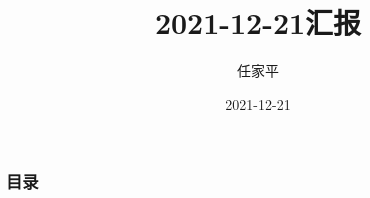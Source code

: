 \documentclass[12pt, utf-8]{beamer}
\title{2021-12-21汇报}
\author{任家平}
\institute{同济大学测绘与地理信息学院}
\date{2021-12-21}
\begin{document}
\begin{frame}
    \titlepage
\end{frame}

\begin{frame}
    \frametitle{目录}
    \tableofcontents
\end{frame}






%     

% 
\end{document}
